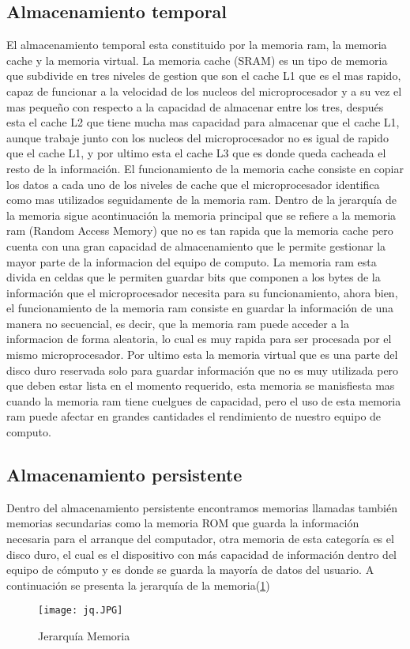 \documentclass{article}
\begin{document}
	\subsection{Almacenamiento temporal}
	El almacenamiento temporal esta constituido por la memoria ram, la memoria cache y la memoria virtual. La memoria cache (SRAM) es un tipo de memoria que subdivide en tres niveles de gestion que son el cache L1 que es el mas rapido, capaz de funcionar a la velocidad de los nucleos del microprocesador y a su vez el mas pequeño con respecto a la capacidad de almacenar entre los tres, después esta el cache L2 que tiene mucha mas capacidad para almacenar que el cache L1, aunque trabaje junto con los nucleos del microprocesador no es igual de rapido que el cache L1, y por ultimo esta el cache L3 que es donde queda cacheada el resto de la información. El funcionamiento de la memoria cache consiste en copiar los datos a cada uno de los niveles de cache que el microprocesador identifica como mas utilizados seguidamente de la memoria ram. Dentro de la jerarquía de la memoria sigue acontinuación la memoria principal que se refiere a la memoria ram (Random Access Memory) que no es tan rapida que la memoria cache pero cuenta con una gran capacidad de almacenamiento que le permite gestionar la mayor parte de la informacion del equipo de computo. La memoria ram esta divida en celdas que le permiten guardar bits que componen a los bytes de la información que el microprocesador necesita para su funcionamiento, ahora bien, el funcionamiento de la memoria ram consiste en guardar la información de una manera no secuencial, es decir, que la memoria ram puede acceder a la informacion de forma aleatoria, lo cual es muy rapida para ser procesada por el mismo microprocesador. Por ultimo esta la memoria virtual que es una parte del disco duro  reservada solo para guardar información que no es muy utilizada pero que deben estar lista en el momento requerido, esta memoria se manisfiesta mas cuando la memoria ram tiene cuelgues de capacidad, pero el uso de esta memoria ram puede afectar en grandes cantidades el rendimiento de nuestro equipo de computo. \cite{memorypc}
	
	\subsection{Almacenamiento persistente}
	Dentro del almacenamiento persistente encontramos memorias llamadas también memorias secundarias como la memoria ROM que guarda la información necesaria para el arranque del computador, otra memoria de esta categoría es el disco duro, el cual es el dispositivo con más capacidad de información dentro del equipo de cómputo y es donde se guarda la mayoría de datos del usuario.
	A continuación se presenta la jerarquía de la memoria(\ref{fig:Jerarquía Memoria})
	\begin{figure}[h]
		\texttt{[image: jq.JPG]}
		\centering
		\caption{Jerarquía Memoria}
		\label{fig:Jerarquía Memoria}
	\end{figure}
	
\end{document}
